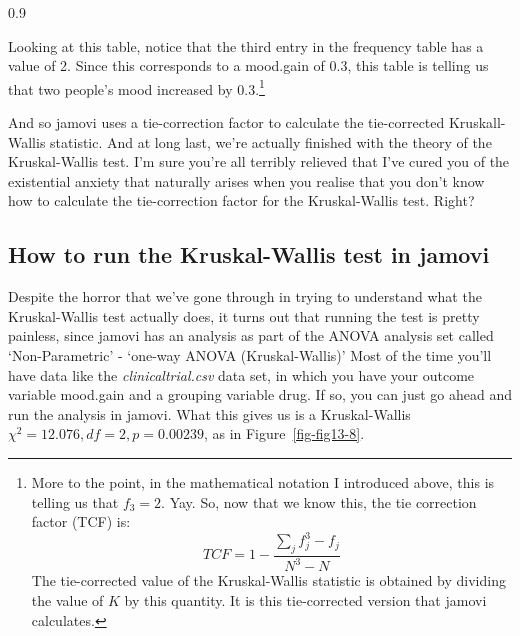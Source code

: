 \documentclass[
  a4paper,
]{book}
\begin{document}
\begin{table}[ht]
\begin{centerbox}
\begin{threeparttable}
\begin{tabularx}{0.9\textwidth}
\end{tabularx} 

\end{threeparttable}\par\end{centerbox}

\end{table}
 

Looking at this table, notice that the third entry in the frequency
table has a value of 2. Since this corresponds to a mood.gain of 0.3,
this table is telling us that two people's mood increased by
0.3.\footnote{More to the point, in the mathematical notation I
  introduced above, this is telling us that \(f_3 = 2\). Yay. So, now
  that we know this, the tie correction factor (TCF) is:
  \[TCF=1-\frac{\sum_j f_j^3 - f_j}{N^3 - N}\] The tie-corrected value
  of the Kruskal-Wallis statistic is obtained by dividing the value of
  \(K\) by this quantity. It is this tie-corrected version that jamovi
  calculates.}

And so jamovi uses a tie-correction factor to calculate the
tie-corrected Kruskall-Wallis statistic. And at long last, we're
actually finished with the theory of the Kruskal-Wallis test. I'm sure
you're all terribly relieved that I've cured you of the existential
anxiety that naturally arises when you realise that you don't know how
to calculate the tie-correction factor for the Kruskal-Wallis test.
Right?

\hypertarget{how-to-run-the-kruskal-wallis-test-in-jamovi}{%
\subsection{How to run the Kruskal-Wallis test in
jamovi}\label{how-to-run-the-kruskal-wallis-test-in-jamovi}}

Despite the horror that we've gone through in trying to understand what
the Kruskal-Wallis test actually does, it turns out that running the
test is pretty painless, since jamovi has an analysis as part of the
ANOVA analysis set called `Non-Parametric' - `one-way ANOVA
(Kruskal-Wallis)' Most of the time you'll have data like the
\emph{clinicaltrial.csv} data set, in which you have your outcome
variable mood.gain and a grouping variable drug. If so, you can just go
ahead and run the analysis in jamovi. What this gives us is a
Kruskal-Wallis \(\chi^2 =12.076, df = 2, p = 0.00239\), as in
Figure~\ref{fig-fig13-8}.
\end{document}
